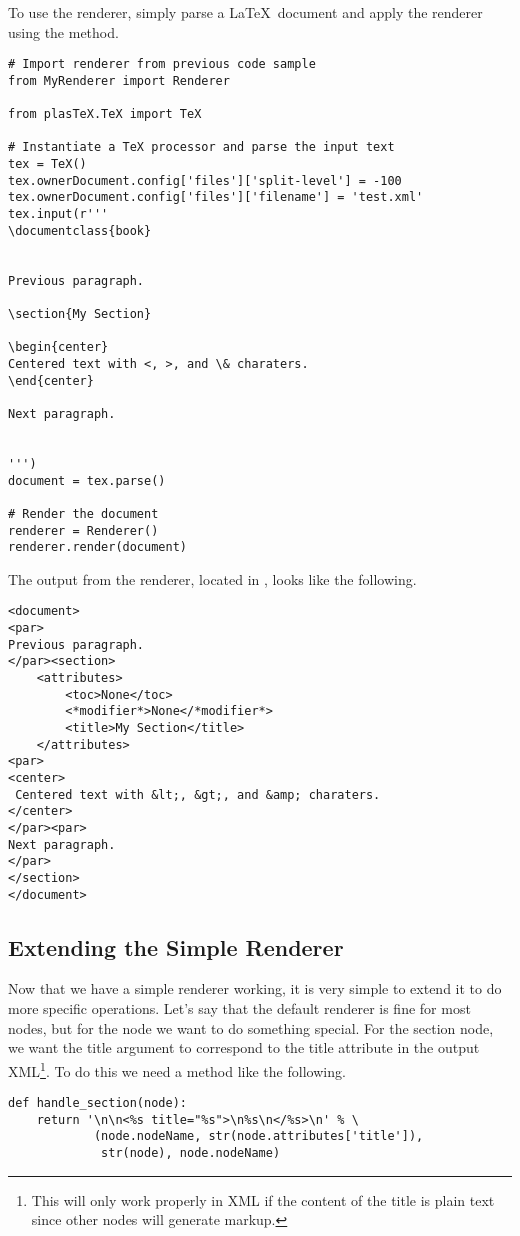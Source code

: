 To use the renderer, simply parse a \LaTeX\ document and apply the renderer
using the  method.
\begin{verbatim}
# Import renderer from previous code sample
from MyRenderer import Renderer

from plasTeX.TeX import TeX

# Instantiate a TeX processor and parse the input text
tex = TeX()
tex.ownerDocument.config['files']['split-level'] = -100
tex.ownerDocument.config['files']['filename'] = 'test.xml'
tex.input(r'''
\documentclass{book}


Previous paragraph.

\section{My Section}

\begin{center}
Centered text with <, >, and \& charaters.
\end{center}

Next paragraph.


''')
document = tex.parse()

# Render the document
renderer = Renderer()
renderer.render(document)
\end{verbatim}

The output from the renderer, located in , looks like the
following.
\begin{verbatim}
<document>
<par>
Previous paragraph.
</par><section>
    <attributes>
        <toc>None</toc>
        <*modifier*>None</*modifier*>
        <title>My Section</title>
    </attributes>
<par>
<center>
 Centered text with &lt;, &gt;, and &amp; charaters.
</center>
</par><par>
Next paragraph.
</par>
</section>
</document>
\end{verbatim}


\subsection{Extending the Simple Renderer}

Now that we have a simple renderer working, it is very simple to extend
it to do more specific operations.  Let's say that the default renderer
is fine for most nodes, but for the  node we want to do
something special.  For the section node, we want the title argument
to correspond to the title attribute in the output XML\footnote{This
will only work properly in XML if the content of the title is plain text
since other nodes will generate markup.}.  To do this we need a
method like the following.
\begin{verbatim}
def handle_section(node):
    return '\n\n<%s title="%s">\n%s\n</%s>\n' % \
            (node.nodeName, str(node.attributes['title']),
             str(node), node.nodeName)
\end{verbatim}

